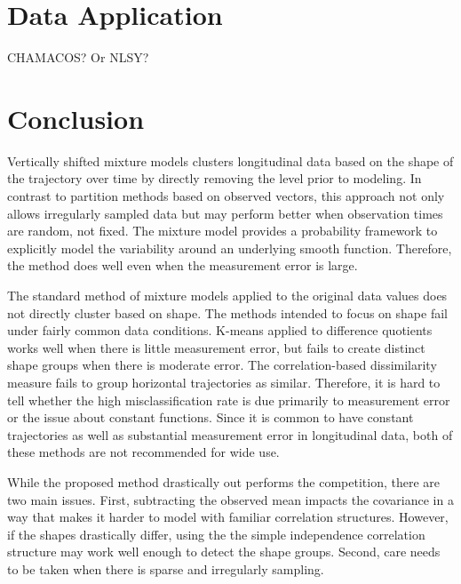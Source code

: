 \documentclass[12pt]{article}
\begin{document}
\section{Data Application}
CHAMACOS? Or NLSY?

\section{Conclusion}
Vertically shifted mixture models clusters longitudinal data based on the shape of the trajectory over time by directly removing the level prior to modeling. In contrast to partition methods based on observed vectors, this approach not only allows irregularly sampled data but may perform better when observation times are random, not fixed. The mixture model provides a probability framework to explicitly model the variability around an underlying smooth function. Therefore, the method does well even when the measurement error is large. 

The standard method of mixture models applied to the original data values does not directly cluster based on shape. The methods intended to focus on shape fail under fairly common data conditions. K-means applied to difference quotients works well when there is little measurement error, but fails to create distinct shape groups when there is moderate error. The correlation-based dissimilarity measure fails to group horizontal trajectories as similar. Therefore, it is hard to tell whether the high misclassification rate is due primarily to measurement error or the issue about constant functions. Since it is common to have constant trajectories as well as substantial measurement error in longitudinal data, both of these methods are not recommended for wide use. 

While the proposed method drastically out performs the competition, there are two main issues. First, subtracting the observed mean impacts the covariance in a way that makes it harder to model with familiar correlation structures. However, if the shapes drastically differ, using the the simple independence correlation structure may work well enough to detect the shape groups. Second, care needs to be taken when there is sparse and irregularly sampling. 

\printbibliography
\end{document}
